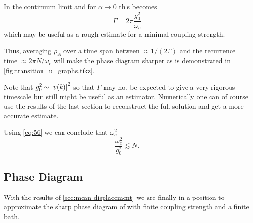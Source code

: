 \documentclass[fontsize=10pt,paper=b5,open=any,
twoside=no,toc=listof,toc=bibliography,headings=optiontohead,
captions=nooneline,captions=tableabove,english,DIV=15,numbers=noenddot,final,parskip=half-,
headinclude=true,footinclude=false,BCOR=0mm]{scrartcl}
\begin{document}
In the continuum limit and for \(α\to 0\) this becomes
\begin{equation}
  \label{eq:56}
  Γ = 2π \frac{g_{0}^{2}}{ω_{c}}
\end{equation}
which may be useful as a rough estimate for a minimal coupling strength.

Thus, averaging \(ρ_{A}\) over a time span between \(\approx 1/(2Γ)\)
and the recurrence time \(\approx 2π N / ω_{c}\) will make the phase
diagram sharper as is demonstrated in
\cref{fig:transition_u_graphs.tikz}.

Note that \(g_{0}^{2}\sim \abs{v(k)}^{2}\) so that \(Γ\) may not be
expected to give a very rigorous timescale but still might be useful
as an estimator. Numerically one can of course use the results of the
last section to reconstruct the full solution and get a more accurate
estimate.

Using \cref{eq:56} we can conclude that \(ω_{c}^{2}\)
\begin{equation}
  \label{eq:57}
  \frac{ω_{c}^{2}}{g_{0}^{2}} \lesssim N.
\end{equation}

\subsection{Phase Diagram}
\label{sec:phase-diagram}

With the results of \cref{sec:mean-displacement} we are finally in a
position to approximate the sharp phase diagram of
\cite{Ricottone2020} with finite coupling strength and a finite bath.
\end{document}
